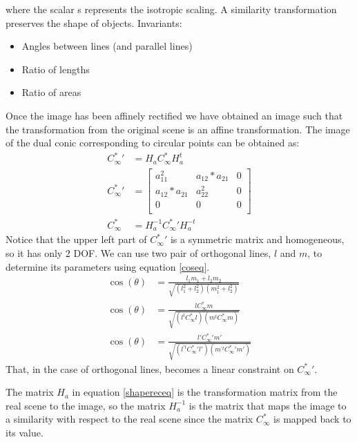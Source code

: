 \documentclass[11pt, oneside]{article}   	%
\begin{document}
where the scalar s represents the isotropic scaling.
A similarity transformation preserves the shape of objects.
Invariants:
\begin{itemize}
\item Angles between lines (and parallel lines)
\item Ratio of lengths
\item Ratio of areas
\end{itemize}

Once the image has been affinely rectified we have obtained an image such that the transformation from the original scene is an affine transformation.
The image of the dual conic corresponding to circular points can be obtained as:
\begin{subequations} \label{shapereceq}
\begin{align}
C^*_{\infty}{'} & = H_a C^*_{\infty} H_a^t  \\
C^*_{\infty}{'} & = \begin{bmatrix} 
a_{11}^{2} & a_{12}*a_{21} & 0 \\
 a_{12}*a_{21} &  a_{22}^{2}  & 0 \\
0 &  0 & 0 \\
\end{bmatrix} \\
 C^*_{\infty}  & = H_a ^{-1} C^*_{\infty}{'} H_a ^{-t}
\end{align}
\end{subequations}
Notice that the upper left part of $C^*_{\infty}{'} $ is a symmetric matrix and homogeneous, so it has only 2 DOF.
We can use two pair of orthogonal lines, $l$ and $m$, to determine its parameters using equation \ref{coseq}.
\begin{subequations} \label{coseq}
\begin{align}
\cos(\theta) & = \frac{l_1 m_1 + l_2  m_2}{\sqrt{(l_1^2 + l_2^2)(m_1^2 + l_2 ^2)}}  \\
\cos(\theta) & = \frac{l C^*_{\infty} m} {\sqrt{(l^t C^*_{\infty} l) (m^t C^*_{\infty} m)}} \\
\cos(\theta) & = \frac{l' C^{*}_{\infty}{'} m'} {\sqrt{(l^{'t} C^{*}_{\infty}{'} l') (m^{'t} C^{*}_{\infty}{'} m')}}
\end{align}
\end{subequations}
That, in the case of orthogonal lines, becomes a linear constraint on $C^{*}_{\infty}{'}$.

The matrix $H_a$ in equation \ref{shapereceq} is the transformation matrix from the real scene to the image, so the matrix $H_a^{-1}$ is the matrix that maps the image to a similarity with respect to the real scene since the matrix $C^*_{\infty} $ is mapped back to its value.
\end{document}
